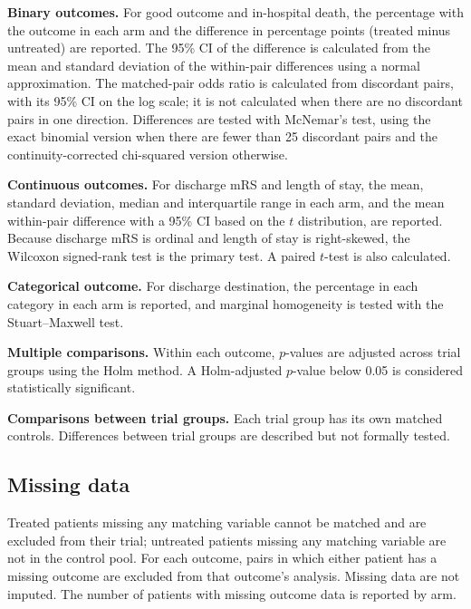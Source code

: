 \textbf{Binary outcomes.} For good outcome and in-hospital death, the percentage with the outcome in each arm and the difference in percentage points (treated minus untreated) are reported. The 95\% CI of the difference is calculated from the mean and standard deviation of the within-pair differences using a normal approximation. The matched-pair odds ratio is calculated from discordant pairs, with its 95\% CI on the log scale; it is not calculated when there are no discordant pairs in one direction. Differences are tested with McNemar's test\cite{mcnemar_note_1947}, using the exact binomial version when there are fewer than 25 discordant pairs and the continuity-corrected chi-squared version otherwise.

\textbf{Continuous outcomes.} For discharge mRS and length of stay, the mean, standard deviation, median and interquartile range in each arm, and the mean within-pair difference with a 95\% CI based on the $t$ distribution, are reported. Because discharge mRS is ordinal and length of stay is right-skewed, the Wilcoxon signed-rank test\cite{wilcoxon_individual_1945} is the primary test. A paired $t$-test is also calculated.

\textbf{Categorical outcome.} For discharge destination, the percentage in each category in each arm is reported, and marginal homogeneity is tested with the Stuart--Maxwell test\cite{stuart_test_1955, maxwell_comparing_1970}.

\textbf{Multiple comparisons.} Within each outcome, $p$-values are adjusted across trial groups using the Holm method\cite{holm_simple_1979}. A Holm-adjusted $p$-value below 0.05 is considered statistically significant.

\textbf{Comparisons between trial groups.} Each trial group has its own matched controls. Differences between trial groups are described but not formally tested.

\subsection{Missing data}

Treated patients missing any matching variable cannot be matched and are excluded from their trial; untreated patients missing any matching variable are not in the control pool. For each outcome, pairs in which either patient has a missing outcome are excluded from that outcome's analysis. Missing data are not imputed. The number of patients with missing outcome data is reported by arm.


